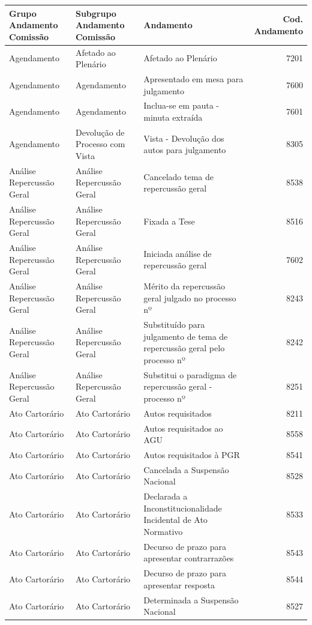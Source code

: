 \documentclass[
]{book}
\begin{document}
\begin{tabular}{l|l|l|r}
\hline
Grupo Andamento Comissão & Subgrupo Andamento Comissão & Andamento & Cod. Andamento\\
\hline
Agendamento & Afetado ao Plenário & Afetado ao Plenário & 7201\\
\hline
Agendamento & Agendamento & Apresentado em mesa para julgamento & 7600\\
\hline
Agendamento & Agendamento & Inclua-se em pauta - minuta extraída & 7601\\
\hline
Agendamento & Devolução de Processo com Vista & Vista - Devolução dos autos para julgamento & 8305\\
\hline
Análise Repercussão Geral & Análise Repercussão Geral & Cancelado tema de repercussão geral & 8538\\
\hline
Análise Repercussão Geral & Análise Repercussão Geral & Fixada a Tese & 8516\\
\hline
Análise Repercussão Geral & Análise Repercussão Geral & Iniciada análise de repercussão geral & 7602\\
\hline
Análise Repercussão Geral & Análise Repercussão Geral & Mérito da repercussão geral julgado no processo nº & 8243\\
\hline
Análise Repercussão Geral & Análise Repercussão Geral & Substituído para julgamento de tema de repercussão geral pelo processo nº & 8242\\
\hline
Análise Repercussão Geral & Análise Repercussão Geral & Substitui o paradigma de repercussão geral - processo nº & 8251\\
\hline
Ato Cartorário & Ato Cartorário & Autos requisitados & 8211\\
\hline
Ato Cartorário & Ato Cartorário & Autos requisitados ao AGU & 8558\\
\hline
Ato Cartorário & Ato Cartorário & Autos requisitados à PGR & 8541\\
\hline
Ato Cartorário & Ato Cartorário & Cancelada a Suspensão Nacional & 8528\\
\hline
Ato Cartorário & Ato Cartorário & Declarada a Inconstitucionalidade Incidental de Ato Normativo & 8533\\
\hline
Ato Cartorário & Ato Cartorário & Decurso de prazo para apresentar contrarrazões & 8543\\
\hline
Ato Cartorário & Ato Cartorário & Decurso de prazo para apresentar resposta & 8544\\
\hline
Ato Cartorário & Ato Cartorário & Determinada a Suspensão Nacional & 8527\\

\end{tabular}
\end{document}
